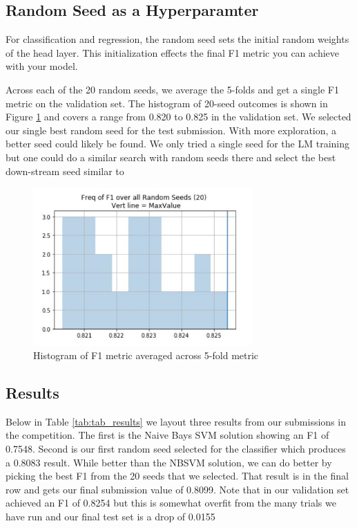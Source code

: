 \documentclass[smallextended]{svjour3}       %
\begin{document}
\subsection{Random Seed as a Hyperparamter}
\label{sec:rand_seeds}
For classification and regression, the random seed sets the initial random weights of the head layer. This initialization effects the final F1 metric you can achieve with your model.  

Across each of the 20 random seeds, we average the 5-folds and get a single F1 metric on the validation set.  The histogram of 20-seed outcomes is shown in Figure \ref{fig:random_seed_hist} and covers a range  from 0.820 to 0.825 in the validation set. We selected our single best random seed for the test submission. With more exploration, a better seed could likely be found.  We only tried a single seed for the LM training but one could do a similar search with random seeds there and select the best down-stream seed similar to \cite{poleval}

\begin{figure}[ht]
	\includegraphics[width=0.75\textwidth]{seed_hist_f1}
	\caption{Histogram of F1 metric averaged across 5-fold metric}
	\label{fig:random_seed_hist}
\end{figure}

\subsection{Results}
Below in Table \ref{tab:tab_results} we layout three results from our submissions in the competition.  The first is the Naive Bays SVM solution showing an F1 of 0.7548.  Second is our first random seed selected for the classifier which produces a 0.8083 result.  While better than the NBSVM solution, we can do better by picking the best F1 from the 20 seeds that we selected. That result is in the final row and gets our final submission value of 0.8099. Note that in our validation set achieved an F1 of 0.8254 but this is somewhat overfit from the many trials we have run and our final test set is a drop of 0.0155
\end{document}
